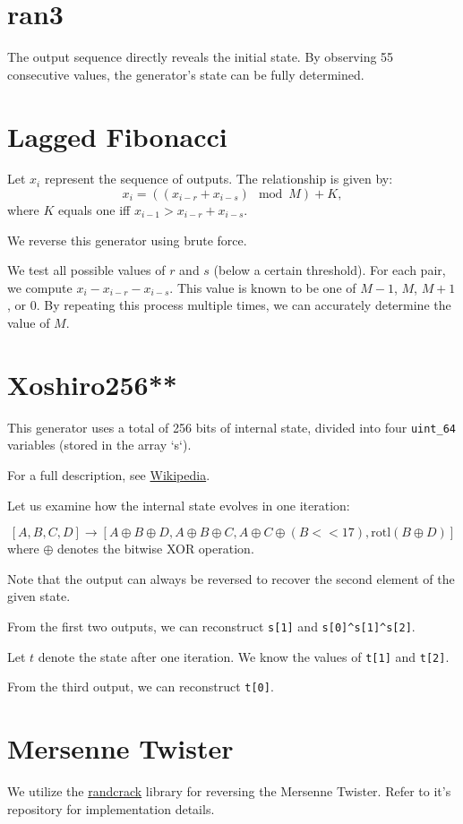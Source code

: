 \documentclass[12pt, a4paper]{report}
\begin{document}
\section{ran3}
The output sequence directly reveals the initial state. By observing 55 consecutive values,
the generator's state can be fully determined.

\section{Lagged Fibonacci}
Let $x_i$ represent the sequence of outputs. The relationship is given by:
$$x_{i} = ((x_{i-r} + x_{i-s}) \mod M) + K,$$ 
where $K$ equals one iff $x_{i-1} > x_{i-r} + x_{i-s}$.

We reverse this generator using brute force.

We test all possible values of $r$ and $s$ (below a certain threshold). For each pair,
we compute $x_{i} - x_{i-r} - x_{i-s}$. This value is known to be one of $M-1$, $M$, $M+1$,
or $0$. By repeating this process multiple times, we can accurately determine the value of $M$.

\section{Xoshiro256**}
This generator uses a total of 256 bits of internal state, divided into four \verb|uint_64|
variables (stored in the array `s`).

For a full description, see \href{https://en.m.wikipedia.org/wiki/Xorshift#xoshiro256**}{Wikipedia}.

Let us examine how the internal state evolves in one iteration:

$$[A, B, C, D] \to [A\oplus B\oplus D, A\oplus B \oplus C, A\oplus C\oplus (B<<17), \text{rotl}(B\oplus D)]$$
where $\oplus$ denotes the bitwise XOR operation.

Note that the output can always be reversed to recover the second element of the given state.

From the first two outputs, we can reconstruct \verb|s[1]| and \verb|s[0]^s[1]^s[2]|.

Let $t$ denote the state after one iteration. We know the values of \verb|t[1]| and \verb|t[2]|.

From the third output, we can reconstruct \verb|t[0]|.

\section{Mersenne Twister}
We utilize the \href{https://github.com/tna0y/Python-random-module-cracker}{randcrack}
library for reversing the Mersenne Twister. Refer to it's repository for implementation details.
\end{document}
